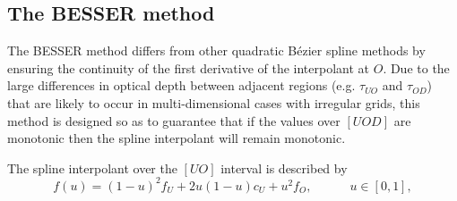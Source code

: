 \subsection{The BESSER method}

The BESSER method differs from other quadratic Bézier spline methods by ensuring the continuity of the first derivative of the interpolant at $O$.
Due to the large differences in optical depth between adjacent regions (e.g. $\tau_{UO}$ and $\tau_{OD}$) that are likely to occur in multi-dimensional cases with irregular grids, this method is designed so as to guarantee that if the values over $[UOD]$ are monotonic then the spline interpolant will remain monotonic.

The spline interpolant over the $[UO]$ interval is described by
\begin{equation}
    f(u) = (1-u)^2f_U + 2u(1-u)c_U + u^2f_O,\hspace{3em}u\in[0,1],
\end{equation}

